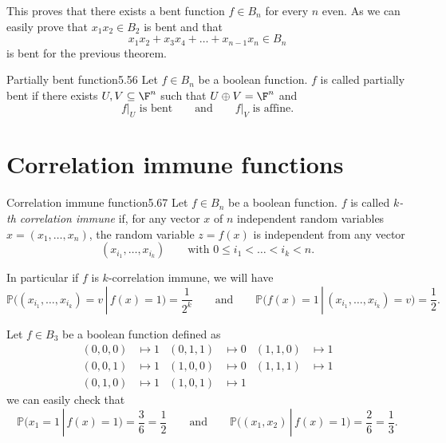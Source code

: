 \begin{oss}
	This proves that there exists a bent function \(f\in B_n\) for every \(n\) even. As we can easily prove that \(x_1 x_2 \in B_2\) is bent and that
	\[
		x_1 x_2 + x_3 x_4 + \ldots + x_{n-1} x_n \in B_n
	\]
	is bent for the previous theorem.
\end{oss}

\begin{defn}{Partially bent function}{5.56}
	Let \(f\in B_n\) be a boolean function. \(f\) is called partially bent if there exists \(U,V\subseteq \F^n\) such that \(U\oplus V = \F^n\) and
	\[
		f\big\rvert_U \text{ is bent}\qquad\text{and}\qquad f\big\rvert_V \text{ is affine}.
	\]
\end{defn}

\section{Correlation immune functions}

\begin{defn}{Correlation immune function}{5.67}
	Let \(f\in B_n\) be a boolean function. \(f\) is called \emph{\(k\)-th correlation immune} if, for any vector \(x\) of \(n\) independent random variables \(x=(x_1,\ldots,x_n)\), the random variable \(z = f(x)\) is independent from any vector
	\[
		(x_{i_1},\ldots,x_{i_k})\qquad\text{with } 0 \le i_1 < \ldots < i_k < n.
	\]
\end{defn}

\begin{oss}
	In particular if \(f\) is \(k\)-correlation immune, we will have
	\[
		\mathbb{P}\big((x_{i_1},\ldots,x_{i_k}) = v \,|\, f(x) = 1 \big) = \frac{1}{2^k} \qquad\text{and}\qquad \mathbb{P}\big(f(x)=1 \,|\, (x_{i_1},\ldots,x_{i_k})=v\big) = \frac{1}{2}.
	\]
\end{oss}

\begin{ese}
	Let \(f \in B_3\) be a boolean function defined as
	\begin{align*}
		(0,0,0) & \longmapsto 1 & (0,1,1) & \longmapsto 0  & (1,1,0) & \longmapsto 1 \\
		(0,0,1) & \longmapsto 1 & (1,0,0) & \longmapsto 0  & (1,1,1) & \longmapsto 1 \\
		(0,1,0) & \longmapsto 1 & (1,0,1) & \longmapsto 1
	\end{align*}
	we can easily check that
	\[
		\mathbb{P}\big(x_1 = 1 \,|\, f(x) = 1\big) = \frac{3}{6}=\frac{1}{2} \qquad\text{and}\qquad \mathbb{P}\big((x_1,x_2) \,|\, f(x)=1\big) = \frac{2}{6} = \frac{1}{3}.
	\]
\end{ese}

